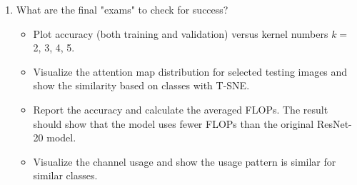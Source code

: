 \documentclass[10pt, journal, onecolumn]{IEEEtran}
\begin{document}
\begin{enumerate}
\begin{itemize}
    \end{itemize}
    \item What are the final "exams" to check for success?
        \begin{itemize}
            \item \cite{chen2020dynamic} Plot accuracy (both training and validation) versus kernel numbers $k=$ 2, 3, 4, 5.
            \item \cite{chen2020dynamic} Visualize the attention map distribution for selected testing images and show the similarity based on classes with T-SNE.
            \item \cite{Bejnordi2020Batch-shaping} Report the accuracy and calculate the averaged FLOPs. The result should show that the model uses fewer FLOPs than the original ResNet-20 model.
            \item \cite{Bejnordi2020Batch-shaping} Visualize the channel usage and show the usage pattern is similar for similar classes.
        \end{itemize}
          
\end{enumerate}

\printbibliography
\end{document}
